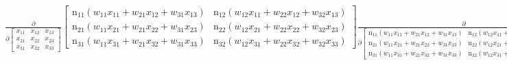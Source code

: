 \documentclass[11pt]{article}
\newcommand{\prompt}[4]{
        \ttfamily\llap{{\color{#2}[#3]:\hspace{3pt}#4}}\vspace{-\baselineskip}
    }
\begin{document}
            
\prompt{Out}{outcolor}{180}{}
    
    $\displaystyle \frac{\partial}{\partial \left[\begin{matrix}x_{11} & x_{12} & x_{13}\\x_{21} & x_{22} & x_{23}\\x_{31} & x_{32} & x_{33}\end{matrix}\right]} \left[\begin{matrix}\operatorname{n_{11}}{\left(w_{11} x_{11} + w_{21} x_{12} + w_{31} x_{13} \right)} & \operatorname{n_{12}}{\left(w_{12} x_{11} + w_{22} x_{12} + w_{32} x_{13} \right)}\\\operatorname{n_{21}}{\left(w_{11} x_{21} + w_{21} x_{22} + w_{31} x_{23} \right)} & \operatorname{n_{22}}{\left(w_{12} x_{21} + w_{22} x_{22} + w_{32} x_{23} \right)}\\\operatorname{n_{31}}{\left(w_{11} x_{31} + w_{21} x_{32} + w_{31} x_{33} \right)} & \operatorname{n_{32}}{\left(w_{12} x_{31} + w_{22} x_{32} + w_{32} x_{33} \right)}\end{matrix}\right] \frac{\partial}{\partial \left[\begin{matrix}\operatorname{n_{11}}{\left(w_{11} x_{11} + w_{21} x_{12} + w_{31} x_{13} \right)} & \operatorname{n_{12}}{\left(w_{12} x_{11} + w_{22} x_{12} + w_{32} x_{13} \right)}\\\operatorname{n_{21}}{\left(w_{11} x_{21} + w_{21} x_{22} + w_{31} x_{23} \right)} & \operatorname{n_{22}}{\left(w_{12} x_{21} + w_{22} x_{22} + w_{32} x_{23} \right)}\\\operatorname{n_{31}}{\left(w_{11} x_{31} + w_{21} x_{32} + w_{31} x_{33} \right)} & \operatorname{n_{32}}{\left(w_{12} x_{31} + w_{22} x_{32} + w_{32} x_{33} \right)}\end{matrix}\right]} \left[\begin{matrix}\sigma{\left(\operatorname{n_{11}}{\left(w_{11} x_{11} + w_{21} x_{12} + w_{31} x_{13} \right)} \right)} & \sigma{\left(\operatorname{n_{12}}{\left(w_{12} x_{11} + w_{22} x_{12} + w_{32} x_{13} \right)} \right)}\\\sigma{\left(\operatorname{n_{21}}{\left(w_{11} x_{21} + w_{21} x_{22} + w_{31} x_{23} \right)} \right)} & \sigma{\left(\operatorname{n_{22}}{\left(w_{12} x_{21} + w_{22} x_{22} + w_{32} x_{23} \right)} \right)}\\\sigma{\left(\operatorname{n_{31}}{\left(w_{11} x_{31} + w_{21} x_{32} + w_{31} x_{33} \right)} \right)} & \sigma{\left(\operatorname{n_{32}}{\left(w_{12} x_{31} + w_{22} x_{32} + w_{32} x_{33} \right)} \right)}\end{matrix}\right]$
\end{document}
